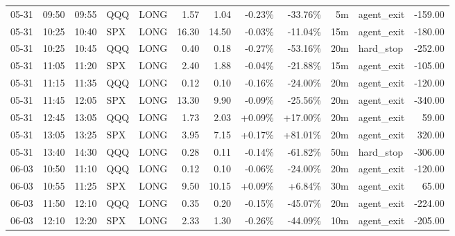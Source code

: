 \documentclass[11pt,a4paper]{article}
\begin{document}
\begin{center}
\begin{longtable}{>{\color{txtmain}}l l l l l r r r r r >{\color{txtmain}}l r}
05-31 & 09:50 & 09:55 & QQQ & LONG & 1.57 & 1.04 & \textcolor{lossred}{-0.23\%} & \textcolor{lossred}{-33.76\%} & 5m & agent\_exit & \textcolor{lossred}{-159.00} \\
05-31 & 10:25 & 10:40 & SPX & LONG & 16.30 & 14.50 & \textcolor{lossred}{-0.03\%} & \textcolor{lossred}{-11.04\%} & 15m & agent\_exit & \textcolor{lossred}{-180.00} \\
05-31 & 10:25 & 10:45 & QQQ & LONG & 0.40 & 0.18 & \textcolor{lossred}{-0.27\%} & \textcolor{lossred}{-53.16\%} & 20m & hard\_stop & \textcolor{lossred}{-252.00} \\
05-31 & 11:05 & 11:20 & SPX & LONG & 2.40 & 1.88 & \textcolor{lossred}{-0.04\%} & \textcolor{lossred}{-21.88\%} & 15m & agent\_exit & \textcolor{lossred}{-105.00} \\
05-31 & 11:15 & 11:35 & QQQ & LONG & 0.12 & 0.10 & \textcolor{lossred}{-0.16\%} & \textcolor{lossred}{-24.00\%} & 20m & agent\_exit & \textcolor{lossred}{-120.00} \\
05-31 & 11:45 & 12:05 & SPX & LONG & 13.30 & 9.90 & \textcolor{lossred}{-0.09\%} & \textcolor{lossred}{-25.56\%} & 20m & agent\_exit & \textcolor{lossred}{-340.00} \\
05-31 & 12:45 & 13:05 & QQQ & LONG & 1.73 & 2.03 & \textcolor{wingreen}{+0.09\%} & \textcolor{wingreen}{+17.00\%} & 20m & agent\_exit & \textcolor{wingreen}{59.00} \\
05-31 & 13:05 & 13:25 & SPX & LONG & 3.95 & 7.15 & \textcolor{wingreen}{+0.17\%} & \textcolor{wingreen}{+81.01\%} & 20m & agent\_exit & \textcolor{wingreen}{320.00} \\
05-31 & 13:40 & 14:30 & QQQ & LONG & 0.28 & 0.11 & \textcolor{lossred}{-0.14\%} & \textcolor{lossred}{-61.82\%} & 50m & hard\_stop & \textcolor{lossred}{-306.00} \\
06-03 & 10:50 & 11:10 & QQQ & LONG & 0.12 & 0.10 & \textcolor{lossred}{-0.06\%} & \textcolor{lossred}{-24.00\%} & 20m & agent\_exit & \textcolor{lossred}{-120.00} \\
06-03 & 10:55 & 11:25 & SPX & LONG & 9.50 & 10.15 & \textcolor{wingreen}{+0.09\%} & \textcolor{wingreen}{+6.84\%} & 30m & agent\_exit & \textcolor{wingreen}{65.00} \\
06-03 & 11:50 & 12:10 & QQQ & LONG & 0.35 & 0.20 & \textcolor{lossred}{-0.15\%} & \textcolor{lossred}{-45.07\%} & 20m & agent\_exit & \textcolor{lossred}{-224.00} \\
06-03 & 12:10 & 12:20 & SPX & LONG & 2.33 & 1.30 & \textcolor{lossred}{-0.26\%} & \textcolor{lossred}{-44.09\%} & 10m & agent\_exit & \textcolor{lossred}{-205.00} \\

\end{longtable}
\end{center}
\end{document}
